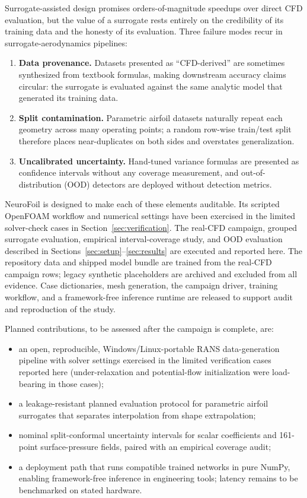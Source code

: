 \documentclass[11pt]{article}
\begin{document}
Surrogate-assisted design promises orders-of-magnitude speedups over
direct CFD evaluation, but the value of a surrogate rests entirely on the
credibility of its training data and the honesty of its evaluation. Three
failure modes recur in surrogate-aerodynamics pipelines:
\begin{enumerate}
  \item \textbf{Data provenance.} Datasets presented as ``CFD-derived'' are
  sometimes synthesized from textbook formulas, making downstream accuracy
  claims circular: the surrogate is evaluated against the same analytic model
  that generated its training data.
  \item \textbf{Split contamination.} Parametric airfoil datasets naturally
  repeat each geometry across many operating points; a random row-wise
  train/test split therefore places near-duplicates on both sides and
  overstates generalization.
  \item \textbf{Uncalibrated uncertainty.} Hand-tuned variance formulas are
  presented as confidence intervals without any coverage measurement, and
  out-of-distribution (OOD) detectors are deployed without detection metrics.
\end{enumerate}

NeuroFoil is designed to make each of these elements auditable. Its scripted
OpenFOAM workflow and numerical settings have been exercised in the limited
solver-check cases in Section~\ref{sec:verification}. The real-CFD
campaign, grouped surrogate evaluation, empirical interval-coverage study, and
OOD evaluation described in Sections~\ref{sec:setup}--\ref{sec:results} are
executed and reported here. The repository data and shipped model bundle are
trained from the real-CFD campaign rows; legacy synthetic placeholders are
archived and excluded from all evidence.
Case dictionaries, mesh generation, the campaign driver, training workflow, and
a framework-free inference runtime are released to support audit and
reproduction of the study.

Planned contributions, to be assessed after the campaign is complete, are:
\begin{itemize}
  \item an open, reproducible, Windows/Linux-portable RANS data-generation
  pipeline with solver settings exercised in the limited verification cases
  reported here (under-relaxation and potential-flow initialization were
  load-bearing in those cases);
  \item a leakage-resistant planned evaluation protocol for parametric airfoil
  surrogates that separates interpolation from shape extrapolation;
  \item nominal split-conformal uncertainty intervals for scalar coefficients and
  161-point surface-pressure fields, paired with an empirical coverage audit;
  \item a deployment path that runs compatible trained networks in pure NumPy,
  enabling framework-free inference in engineering tools; latency remains to be
  benchmarked on stated hardware.
\end{itemize}
\end{document}
